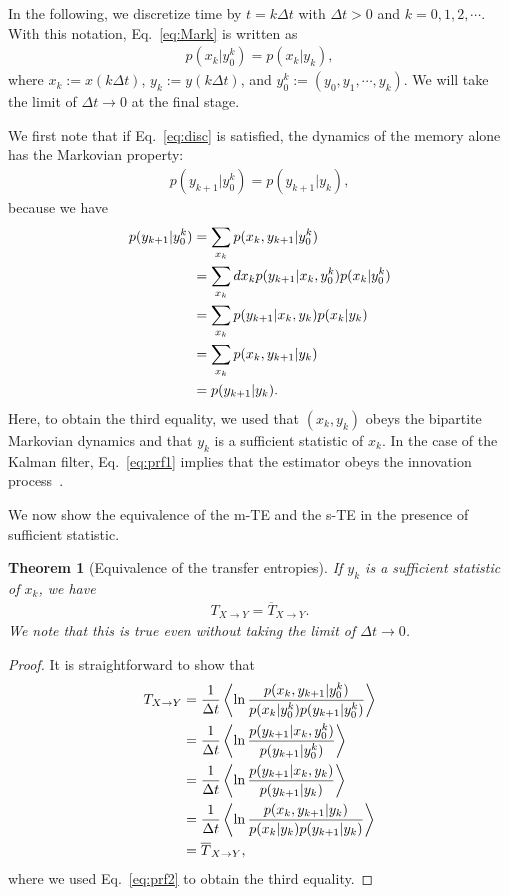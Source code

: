 \documentclass[%
 reprint,
 amsmath,amssymb,
 aps,
]{revtex4-1}
\newcommand{\balign}[1]{\begin{align} #1 \end{align}}
\newcommand{\eref}[1]{Eq.~\eqref{#1}}
\newcommand\mtr{T_{X\to Y}}
\newcommand\str{\overline{T}_{X\to Y}}
\theoremstyle{plain}
\newtheorem{thm}{Theorem}
\begin{document}
In the following, we discretize time by $t= k \Delta t$ with $\Delta t > 0$ and $k = 0, 1, 2, \cdots$. With this notation, \eref{eq:Mark} is written as 
\balign{
p(x_k | y_0^k) = p(x_k | y_k) \label{eq:disc},
}
where $x_k := x(k \Delta t)$, $y_k := y(k \Delta t)$, and $y_0^k := (y_0, y_1, \cdots, y_k)$. We will take the limit of $\Delta t \to 0$ at the final stage.

We first note that if \eref{eq:disc} is satisfied, the dynamics of the memory alone has the  Markovian property:  
\balign{
p(y_{k+1}|y^k_0)=p(y_{k+1}|y_k) \label{eq:prf2},
}
because we  have
\balign{
p(y_{k+1}|y_0^k)&=\sum_{x_k}p(x_k,y_{k+1}|y_0^k) \notag\\
&=\sum_{x_k} dx_k p(y_{k+1}|x_k,y_0^k)p(x_k|y_0^k) \notag\\
&=\sum_{x_k} p(y_{k+1}|x_k,y_k)p(x_k|y_k) \notag\\
&=\sum_{x_k} p(x_k,y_{k+1}|y_k) \notag\\
&=p(y_{k+1}|y_k). \label{eq:prf1}
}
Here, to obtain the third equality, we used that $(x_k,y_k)$ obeys the bipartite Markovian dynamics  and that $y_k$ is a sufficient statistic of $x_k$.
In the case of the Kalman filter, \eref{eq:prf1} implies that the estimator obeys the innovation process~\cite{innovation}.

We now show the equivalence of the m-TE and the s-TE in the presence of sufficient statistic.
\begin{thm}[Equivalence of the transfer entropies]
{\rm If $y_k$ is a sufficient statistic of $x_k$, we have} 
\balign{
\mtr=\str.
}
{\rm We note that this is true even without taking the limit of $\Delta t \to 0$.}
\end{thm}
\begin{proof}
{\rm It is straightforward to show that}
\balign{
\mtr&=\frac{1}{\Delta t}\left<\ln \frac{p(x_k,y_{k+1}|y_0^k)}{p(x_k|y_0^k)p(y_{k+1}|y_0^k)}\right> \notag\\
&=\frac{1}{\Delta t}\left< \ln\frac{p(y_{k+1}|x_k,y_0^k)}{p(y_{k+1}|y_0^k)} \right> \notag\\
&=\frac{1}{\Delta t}\left< \ln \frac{p(y_{k+1}|x_k,y_k)}{p(y_{k+1}|y_k)} \right> \notag\\
&=\frac{1}{\Delta t}\left< \ln\frac{p(x_k,y_{k+1}|y_k)}{p(x_k|y_k)p(y_{k+1}|y_k)}\right> \notag\\
&=\str,
}
{\rm where we used \eref{eq:prf2} to obtain the third equality.}
\end{proof}
\end{document}
